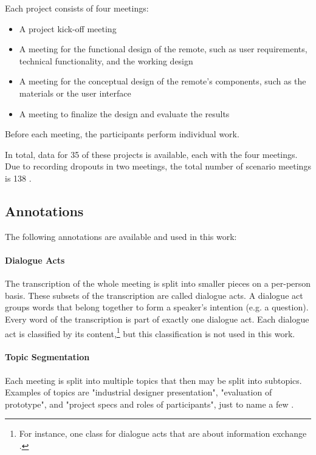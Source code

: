 Each project consists of four meetings:
\begin{itemize}
\item A project kick-off meeting
\item A meeting for the functional design of the remote, such as user requirements, technical functionality, and the working design
\item A meeting for the conceptual design of the remote's components, such as the materials or the user interface
\item A meeting to finalize the design and evaluate the results
\end{itemize}
Before each meeting, the participants perform individual work.

In total, data for 35 of these projects is available, each with the four meetings. 
Due to recording dropouts in two meetings, the total number of scenario meetings is 138 \cite[p.~2]{Mccowan05theami}.

\subsection{Annotations}\label{ssec:ami-annotations}

The following annotations are available and used in this work:

\paragraph{Dialogue Acts}

The transcription of the whole meeting is split into smaller pieces on a per-person basis.
These subsets of the transcription are called dialogue acts.
A dialogue act groups words that belong together to form a speaker's intention (e.g. a question).
Every word of the transcription is part of exactly one dialogue act.
Each dialogue act is classified by its content,\footnote{For instance, one class for dialogue acts that are about information exchange \cite[p.~8]{guidelinesAmiDA}.} but this classification is not used in this work. \cite{amiWebsite}

\paragraph{Topic Segmentation}

Each meeting is split into multiple topics that then may be split into subtopics.
Examples of topics are "industrial designer presentation", "evaluation of prototype", and "project specs and roles of participants", just to name a few \cite{amiWebsite}.

